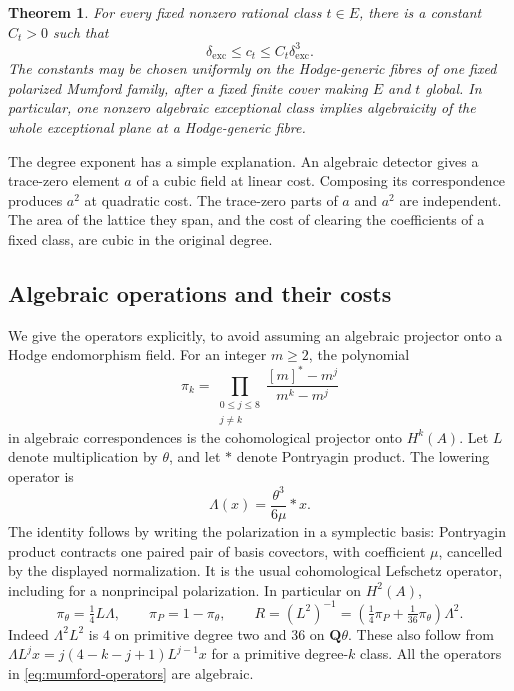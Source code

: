 \documentclass[11pt]{article}
\newtheorem{theorem}{Theorem}[section]
\theoremstyle{definition}
\theoremstyle{remark}
\newcommand{\Q}{\mathbf Q}
\begin{document}
\begin{theorem}\label{thm:mumford-cubic}
For every fixed nonzero rational class $t\in E$, there is a constant
$C_t>0$ such that
\[
 \delta_{\mathrm{exc}}\leq c_t\leq C_t\delta_{\mathrm{exc}}^3.
\]
The constants may be chosen uniformly on the Hodge-generic fibres of
one fixed polarized Mumford family, after a fixed finite cover making
$E$ and $t$ global. In particular, one nonzero algebraic exceptional
class implies algebraicity of the whole exceptional plane at a
Hodge-generic fibre.
\end{theorem}

The degree exponent has a simple explanation. An algebraic detector
gives a trace-zero element $a$ of a cubic field at linear cost.
Composing its correspondence produces $a^2$ at quadratic cost.
The trace-zero parts of $a$ and $a^2$ are independent. The area of the
lattice they span, and the cost of clearing the coefficients of a
fixed class, are cubic in the original degree.

\subsection{Algebraic operations and their costs}

We give the operators explicitly, to avoid assuming an algebraic
projector onto a Hodge endomorphism field.
For an integer $m\geq2$, the polynomial
\[
 \pi_k=
 \prod_{\substack{0\leq j\leq8\\j\ne k}}
 \frac{[m]^*-m^j}{m^k-m^j}
\]
in algebraic correspondences is the cohomological projector onto
$H^k(A)$. Let $L$ denote multiplication by $\theta$, and let $*$ denote
Pontryagin product. The lowering operator is
\[
 \Lambda(x)=\frac{\theta^3}{6\mu}*x.
\]
The identity follows by writing the polarization in a symplectic basis:
Pontryagin product contracts one paired pair of basis covectors, with
coefficient $\mu$, cancelled by the displayed normalization.
It is the usual cohomological Lefschetz operator, including for a
nonprincipal polarization. In particular on $H^2(A)$,
\begin{equation}\label{eq:mumford-operators}
 \pi_\theta=\tfrac14L\Lambda,\qquad
 \pi_P=1-\pi_\theta,\qquad
 R=(L^2)^{-1}
   =\left(\tfrac14\pi_P+\tfrac1{36}\pi_\theta\right)\Lambda^2.
\end{equation}
Indeed $\Lambda^2L^2$ is $4$ on primitive degree two and $36$ on
$\Q\theta$. These also follow from
$\Lambda L^jx=j(4-k-j+1)L^{j-1}x$ for a primitive degree-$k$ class.
All the operators in \eqref{eq:mumford-operators} are algebraic.
\end{document}
